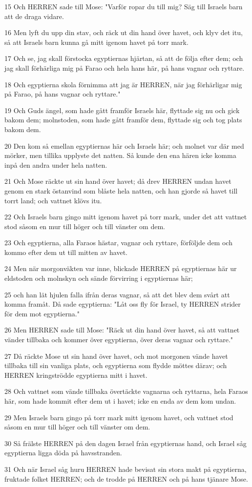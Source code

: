 \par 15 Och HERREN sade till Mose: "Varför ropar du till mig? Säg till Israels barn att de draga vidare.
\par 16 Men lyft du upp din stav, och räck ut din hand över havet, och klyv det itu, så att Israels barn kunna gå mitt igenom havet på torr mark.
\par 17 Och se, jag skall förstocka egyptiernas hjärtan, så att de följa efter dem; och jag skall förhärliga mig på Farao och hela hans här, på hans vagnar och ryttare.
\par 18 Och egyptierna skola förnimma att jag är HERREN, när jag förhärligar mig på Farao, på hans vagnar och ryttare."
\par 19 Och Guds ängel, som hade gått framför Israels här, flyttade sig nu och gick bakom dem; molnstoden, som hade gått framför dem, flyttade sig och tog plats bakom dem.
\par 20 Den kom så emellan egyptiernas här och Israels här; och molnet var där med mörker, men tillika upplyste det natten. Så kunde den ena hären icke komma inpå den andra under hela natten.
\par 21 Och Mose räckte ut sin hand över havet; då drev HERREN undan havet genom en stark östanvind som blåste hela natten, och han gjorde så havet till torrt land; och vattnet klövs itu.
\par 22 Och Israels barn gingo mitt igenom havet på torr mark, under det att vattnet stod såsom en mur till höger och till vänster om dem.
\par 23 Och egyptierna, alla Faraos hästar, vagnar och ryttare, förföljde dem och kommo efter dem ut till mitten av havet.
\par 24 Men när morgonväkten var inne, blickade HERREN på egyptiernas här ur eldstoden och molnskyn och sände förvirring i egyptiernas här;
\par 25 och han lät hjulen falla ifrån deras vagnar, så att det blev dem svårt att komma framåt. Då sade egyptierna: "Låt oss fly för Israel, ty HERREN strider för dem mot egyptierna."
\par 26 Men HERREN sade till Mose: "Räck ut din hand över havet, så att vattnet vänder tillbaka och kommer över egyptierna, över deras vagnar och ryttare."
\par 27 Då räckte Mose ut sin hand över havet, och mot morgonen vände havet tillbaka till sin vanliga plats, och egyptierna som flydde möttes därav; och HERREN kringströdde egyptierna mitt i havet.
\par 28 Och vattnet som vände tillbaka övertäckte vagnarna och ryttarna, hela Faraos här, som hade kommit efter dem ut i havet; icke en enda av dem kom undan.
\par 29 Men Israels barn gingo på torr mark mitt igenom havet, och vattnet stod såsom en mur till höger och till vänster om dem.
\par 30 Så frälste HERREN på den dagen Israel från egyptiernas hand, och Israel såg egyptierna ligga döda på havsstranden.
\par 31 Och när Israel såg huru HERREN hade bevisat sin stora makt på egyptierna, fruktade folket HERREN; och de trodde på HERREN och på hans tjänare Mose.

